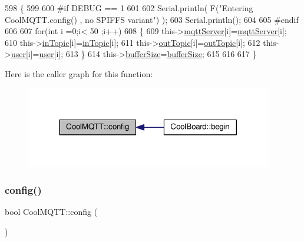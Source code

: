 \begin{DoxyCode}
598 \{
599 
600 \textcolor{preprocessor}{#if DEBUG == 1}
601 
602     Serial.println( F(\textcolor{stringliteral}{"Entering CoolMQTT.config() , no SPIFFS variant"}) );
603     Serial.println();
604 
605 \textcolor{preprocessor}{#endif}
606 
607     \textcolor{keywordflow}{for}(\textcolor{keywordtype}{int} i =0;i< 50 ;i++)
608     \{
609         this->\hyperlink{classCoolMQTT_ab8bb951f87ddbf92db74c2ad16a3e53e}{mqttServer}[i]=\hyperlink{classCoolMQTT_ab8bb951f87ddbf92db74c2ad16a3e53e}{mqttServer}[i];
610         this->\hyperlink{classCoolMQTT_a4492f52a441e83cc5151010317fdb52d}{inTopic}[i]=\hyperlink{classCoolMQTT_a4492f52a441e83cc5151010317fdb52d}{inTopic}[i];
611         this->\hyperlink{classCoolMQTT_a109c786a17b463f9eeba046194279522}{outTopic}[i]=\hyperlink{classCoolMQTT_a109c786a17b463f9eeba046194279522}{outTopic}[i];
612         this->\hyperlink{classCoolMQTT_a8cd47e45d457f908d4b4390b35aaee83}{user}[i]=\hyperlink{classCoolMQTT_a8cd47e45d457f908d4b4390b35aaee83}{user}[i];
613     \}
614     this->\hyperlink{classCoolMQTT_a7f3cf26b51d6770f216e42c5ef13ca9f}{bufferSize}=\hyperlink{classCoolMQTT_a7f3cf26b51d6770f216e42c5ef13ca9f}{bufferSize};
615     
616 
617 \}
\end{DoxyCode}
Here is the caller graph for this function\+:\nopagebreak
\begin{figure}[H]
\begin{center}
\leavevmode
\includegraphics[width=305pt]{classCoolMQTT_a9b703de4f1358f0ee7a5e8c44979c648_icgraph}
\end{center}
\end{figure}
\mbox{\label{classCoolMQTT_a6571671781a505feca9a8a56e256c6bc}} 
\subsubsection{\texorpdfstring{config()}{config()}\hspace{0.1cm}{\footnotesize\ttfamily [2/2]}}
{\footnotesize\ttfamily bool Cool\+M\+Q\+T\+T\+::config (\begin{DoxyParamCaption}{ }\end{DoxyParamCaption})}

